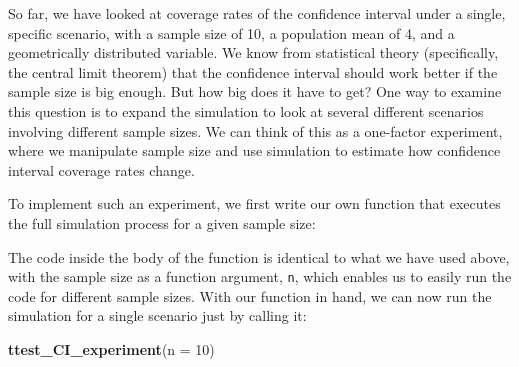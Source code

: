 \documentclass[
]{book}
\newenvironment{Shaded}{\begin{snugshade}}{\end{snugshade}}
\newcommand{\AttributeTok}[1]{\textcolor[rgb]{0.13,0.29,0.53}{#1}}
\newcommand{\CommentTok}[1]{\textcolor[rgb]{0.56,0.35,0.01}{\textit{#1}}}
\newcommand{\ControlFlowTok}[1]{\textcolor[rgb]{0.13,0.29,0.53}{\textbf{#1}}}
\newcommand{\DecValTok}[1]{\textcolor[rgb]{0.00,0.00,0.81}{#1}}
\newcommand{\FunctionTok}[1]{\textcolor[rgb]{0.13,0.29,0.53}{\textbf{#1}}}
\newcommand{\NormalTok}[1]{#1}
\newcommand{\OtherTok}[1]{\textcolor[rgb]{0.56,0.35,0.01}{#1}}
\newcommand{\SpecialCharTok}[1]{\textcolor[rgb]{0.81,0.36,0.00}{\textbf{#1}}}
\begin{document}
So far, we have looked at coverage rates of the confidence interval under a single, specific scenario, with a sample size of 10, a population mean of 4, and a geometrically distributed variable.
We know from statistical theory (specifically, the central limit theorem) that the confidence interval should work better if the sample size is big enough.
But how big does it have to get?
One way to examine this question is to expand the simulation to look at several different scenarios involving different sample sizes.
We can think of this as a one-factor experiment, where we manipulate sample size and use simulation to estimate how confidence interval coverage rates change.

To implement such an experiment, we first write our own function that executes the full simulation process for a given sample size:

\begin{Shaded}
\end{Shaded}

The code inside the body of the function is identical to what we have used above, with the sample size as a function argument, \texttt{n}, which enables us to easily run the code for different sample sizes.
With our function in hand, we can now run the simulation for a single scenario just by calling it:

\begin{Shaded}
\begin{Highlighting}[]
\FunctionTok{ttest\_CI\_experiment}\NormalTok{(}\AttributeTok{n =} \DecValTok{10}\NormalTok{)}
\end{Highlighting}
\end{Shaded}
\end{document}
